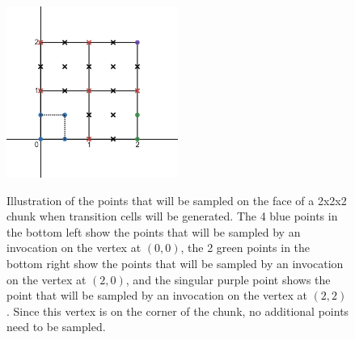 \documentclass{article}
\begin{document}
\begin{enumerate}
\begin{figure}
  \caption{Illustration of the points that will be sampled on the face of a 2x2x2 chunk when transition cells will be generated. The 4 blue points in the bottom left show the points that will be sampled by an invocation on the vertex at $\left(0,0\right)$, the 2 green points in the bottom right show the points that will be sampled by an invocation on the vertex at $\left(2,0\right)$, and the singular purple point shows the point that will be sampled by an invocation on the vertex at $\left(2,2\right)$. Since this vertex is on the corner of the chunk, no additional points need to be sampled.}
  \includegraphics[width=0.5\textwidth]{tv_gen_grid}
  \label{fig:tv_gen_grid}
\end{figure}


\end{enumerate}
\end{document}
